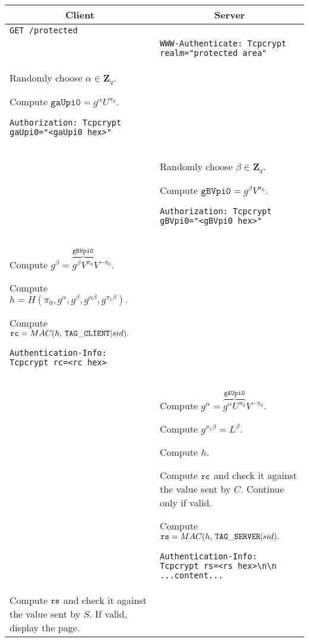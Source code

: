 \documentclass[12pt]{article}
\begin{document}
\begin{tabular}{p{9cm} | p{9cm}}
\multicolumn{1}{c}{\bf Client} & \multicolumn{1}{c}{\bf Server} \\
\hline
{\tt GET /protected} &\\

& {\tt WWW-Authenticate: Tcpcrypt realm="protected area"} \\

Randomly choose $\alpha \in \mathbf{Z}_q.$

Compute $\mathtt{gaUpi0}=g^\alpha U^{\pi_0}.$

{\tt Authorization: Tcpcrypt gaUpi0="<gaUpi0 hex>"} & \\
& Randomly choose $\beta \in \mathbf{Z}_q.$

Compute $\mathtt{gBVpi0}=g^\beta V^{\pi_0}.$

{\tt Authorization: Tcpcrypt gBVpi0="<gBVpi0 hex>"} \\

Compute $g^\beta = \overbrace{g^\beta V^{\pi_0}}^{\mathtt{gBVpi0}} V^{-\pi_0}.$

Compute $h = H(\pi_0, g^\alpha, g^\beta, g^{\alpha \beta}, g^{\pi_1 \beta}).$

Compute ${\tt rc} = MAC(h,\, {\tt TAG\_CLIENT} | sid).$

{\tt Authentication-Info: Tcpcrypt rc=<rc hex>} \\

& Compute $g^\alpha = \overbrace{g^\alpha U^{\pi_0}}^{\mathtt{gAUpi0}} V^{-\pi_0}.$

Compute $g^{\pi_1 \beta} = L^\beta.$

Compute $h$.

Compute ${\tt rc}$ and check it against the value sent by $C.$ Continue only if valid.

Compute ${\tt rs} = MAC(h,\, {\tt TAG\_SERVER} | sid).$

{\tt Authentication-Info: Tcpcrypt rs=<rs hex>\textbackslash n\textbackslash n ...content...} \\

Compute ${\tt rs}$ and check it against the value sent by $S.$ If valid, display the page.
\end{tabular}
\end{document}
